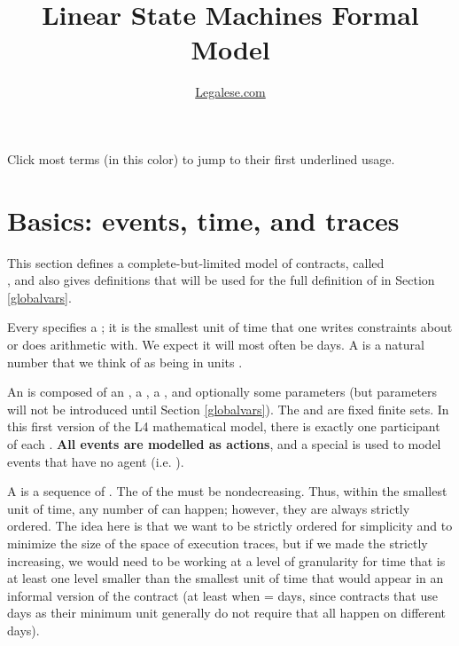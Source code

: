 \documentclass[12pt]{article}
\author{\href{https://legalese.com}{Legalese.com}}
\title{Linear State Machines Formal Model}
\begin{document}
\maketitle



\noindent Click most terms (in \color{TermColor}this color\color{black}) to jump to their first underlined usage.

\tableofcontents



\section{Basics: events, time, and traces} \label{basics}

This section defines a complete-but-limited model of contracts, called \\ , and also gives definitions that will be used for the full definition of  in Section \ref{globalvars}.

Every \Contract specifies a ; it is the smallest unit of time that one writes constraints about or does arithmetic with. We expect it will most often be days. A  is a natural number that we think of as being in units \TimeUnit.

An  is composed of an , a , a \TimeStamp, and optionally some parameters (but parameters will not be introduced until Section \ref{globalvars}). The \Actions and \Roles are fixed finite sets. In this first version of the L4 mathematical model, there is exactly one participant of each \Role.
{\bf All events are modelled as actions}, and a special \Role {}  is used to model events that have no agent (i.e. \Role).

A  is a sequence of \Events. The \TimeStamps of the \Events must be nondecreasing. Thus, within the smallest unit of time, any number of \Events can happen; however, they are always strictly ordered. The idea here is that we want \Events to be strictly ordered for simplicity and to minimize the size of the space of execution traces, but if we made the \TimeStamps strictly increasing, we would need to be working at a level of granularity for time that is at least one level smaller than the smallest unit of time that would appear in an informal version of the contract (at least when \TimeUnit = days, since contracts that use days as their minimum unit generally do not require that all \Events happen on different days).
\end{document}

